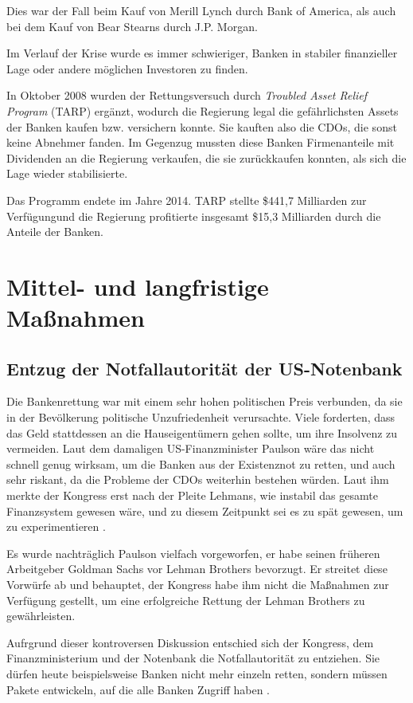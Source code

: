 \documentclass[a4paper,11pt]{report}
\begin{document}
Dies war der Fall beim Kauf von Merill Lynch durch Bank of America, als auch 
bei dem Kauf von Bear Stearns durch J.P. Morgan.

Im Verlauf der Krise wurde es immer schwieriger, Banken in stabiler
finanzieller Lage oder andere m\"oglichen Investoren zu finden.

In Oktober 2008 wurden der Rettungsversuch
durch \textit{Troubled Asset Relief Program} (TARP)
erg\"anzt, wodurch die Regierung legal die gef\"ahrlichsten Assets der Banken
kaufen bzw. versichern konnte. Sie kauften also die CDOs, 
die sonst keine Abnehmer fanden.
Im Gegenzug mussten diese Banken Firmenanteile mit Dividenden
an die Regierung verkaufen, die sie zur\"uckkaufen
konnten, als sich die Lage wieder stabilisierte.

Das Programm endete im Jahre 2014. TARP stellte \$441,7 Milliarden
zur Verf\"ugungund die Regierung profitierte insgesamt \$15,3 Milliarden
durch die Anteile der Banken.

\section{Mittel- und langfristige Maßnahmen}

\subsection{Entzug der Notfallautorit\"at der US-Notenbank}
Die Bankenrettung war mit einem sehr hohen politischen
Preis verbunden, da sie in der Bev\"olkerung politische Unzufriedenheit
verursachte.
Viele forderten, dass das Geld stattdessen an die
Hauseigent\"umern gehen sollte, um ihre Insolvenz zu vermeiden.
Laut dem damaligen US-Finanzminister Paulson w\"are das
nicht schnell genug wirksam, um die Banken aus der Existenznot
zu retten, und auch sehr riskant, da die Probleme
der CDOs weiterhin bestehen w\"urden. Laut ihm merkte der
Kongress erst nach der Pleite Lehmans, wie instabil das gesamte
Finanzsystem gewesen w\"are, und zu diesem Zeitpunkt sei es zu sp\"at
gewesen, um zu experimentieren \parencite{paulsonyt}.

Es wurde nachtr\"aglich Paulson vielfach vorgeworfen, er habe seinen
fr\"uheren Arbeitgeber Goldman Sachs vor Lehman Brothers bevorzugt.
Er streitet diese Vorw\"urfe ab und behauptet, der Kongress
habe ihm nicht die Maßnahmen zur Verf\"ugung gestellt, um
eine erfolgreiche Rettung der Lehman Brothers zu gew\"ahrleisten.

Aufrgrund dieser kontroversen Diskussion entschied sich der Kongress,
dem Finanzministerium und der Notenbank die Notfallautorit\"at zu entziehen.
Sie d\"urfen heute beispielsweise Banken nicht mehr einzeln retten,
sondern m\"ussen Pakete entwickeln, auf die alle Banken Zugriff haben \parencite{geithneryt}.
\end{document}
